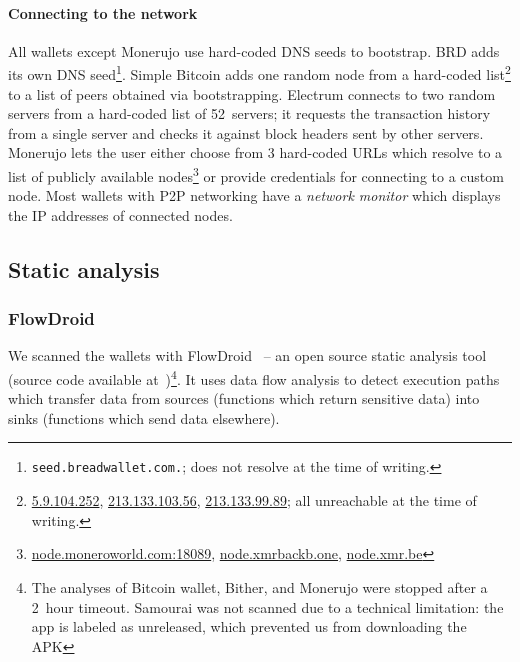 \paragraph{Connecting to the network}
All wallets except Monerujo use hard-coded DNS seeds to bootstrap.
BRD adds its own DNS seed\footnote{\texttt{seed.breadwallet.com.}; does not resolve at the time of writing.}.
Simple Bitcoin adds one random node from a hard-coded list\footnote{\url{5.9.104.252}, \url{213.133.103.56}, \url{213.133.99.89}; all unreachable at the time of writing.} to a list of peers obtained via bootstrapping.
Electrum connects to two random servers from a hard-coded list of 52~servers; it requests the transaction history from a single server and checks it against block headers sent by other servers.
Monerujo lets the user either choose from 3 hard-coded URLs which resolve to a list of publicly available nodes\footnote{\url{node.moneroworld.com:18089}, \url{node.xmrbackb.one}, \url{node.xmr.be}} or provide credentials for connecting to a custom node.
Most wallets with P2P networking have a \textit{network monitor} which displays the IP addresses of connected nodes.


\subsection{Static analysis}

\subsubsection{FlowDroid}

We scanned the wallets with FlowDroid~\cite{Arzt2014} -- an open source static analysis tool (source code available at~\cite{FlowDroid})\footnote{The analyses of Bitcoin wallet, Bither, and Monerujo were stopped after a 2~hour timeout. Samourai was not scanned due to a technical limitation: the app is labeled as unreleased, which prevented us from downloading the APK}.
It uses data flow analysis to detect execution paths which transfer data from sources (functions which return sensitive data) into sinks (functions which send data elsewhere).

